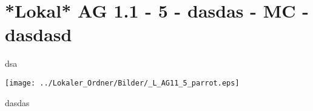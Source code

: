 \section{*Lokal* AG 1.1 - 5 - dasdas - MC - dasdasd}

\begin{beispiel}[AG 1.1]{1}
dsa

\texttt{[image: ../Lokaler\_Ordner/Bilder/\_L\_AG11\_5\_parrot.eps]}

dasdas
\end{beispiel}